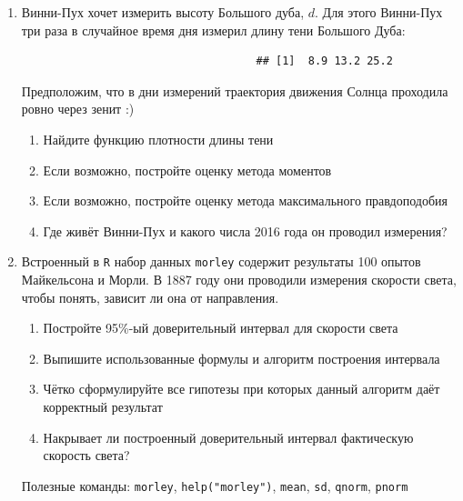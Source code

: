 \documentclass[12pt, a4paper]{article}\usepackage[]{graphicx}\usepackage[]{color}
\makeatletter
\newenvironment{kframe}{%
	\def\at@end@of@kframe{}%
	\ifinner\ifhmode%
	\def\at@end@of@kframe{\end{minipage}}%
\begin{minipage}{\columnwidth}%
	\fi\fi%
	\def\FrameCommand##1{\hskip\@totalleftmargin \hskip-\fboxsep
		\colorbox{shadecolor}{##1}\hskip-\fboxsep
		\hskip-\linewidth \hskip-\@totalleftmargin \hskip\columnwidth}%
	\MakeFramed {\advance\hsize-\width
		\@totalleftmargin\z@ \linewidth\hsize
		\@setminipage}}%
{\par\unskip\endMakeFramed%
	\at@end@of@kframe}
\newenvironment{knitrout}{}{} %
\makeatother
\begin{document}
\begin{enumerate}
							\item Винни-Пух хочет измерить высоту Большого дуба, $d$. Для этого Винни-Пух три раза в случайное время дня измерил длину тени Большого Дуба:

							\begin{knitrout}
								\color{fgcolor}\begin{kframe}
									\begin{verbatim}
									## [1]  8.9 13.2 25.2
									\end{verbatim}
								\end{kframe}
							\end{knitrout}

							Предположим, что в дни измерений траектория движения Солнца проходила ровно через зенит :)

							\begin{enumerate}
								\item Найдите функцию плотности длины тени
								\item Если возможно, постройте оценку метода моментов
								\item Если возможно, постройте оценку метода максимального правдоподобия
								\item Где живёт Винни-Пух и какого числа 2016 года он проводил измерения?
							\end{enumerate}

							\item Встроенный в \verb|R| набор данных \verb|morley| содержит результаты 100 опытов Майкельсона и Морли. В 1887 году они проводили измерения скорости света, чтобы понять, зависит ли она от направления.

							\begin{enumerate}
								\item Постройте 95\%-ый доверительный интервал для скорости света
								\item Выпишите использованные формулы и алгоритм построения интервала
								\item Чётко сформулируйте все гипотезы при которых данный алгоритм даёт корректный результат
								\item Накрывает ли построенный доверительный интервал фактическую скорость света?
							\end{enumerate}

							Полезные команды: \verb|morley|, \verb|help("morley")|, \verb|mean|, \verb|sd|, \verb|qnorm|, \verb|pnorm|




\end{enumerate}
\end{document}
